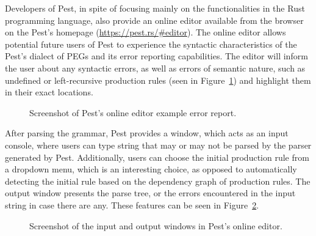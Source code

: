 \documentclass[english,bachelors,forcepolishlogotype]{wizthesis}
\begin{document}
Developers of Pest, in spite of focusing mainly on the functionalities in the
Rust programming language, also provide an online editor available from the
browser on the Pest's homepage (\url{https://pest.rs/#editor}). The online
editor allows potential future users of Pest to experience the syntactic
characteristics of the Pest's dialect of PEGs and its error reporting
capabilities. The editor will inform the user about any syntactic errors, as
well as errors of semantic nature, such as undefined or left-recursive
production rules (seen in Figure~\ref{fig:pest-error}) and highlight them in
their exact locations.

\begin{figure}[ht]
  \centering
  \caption{Screenshot of Pest's online editor example error report.}
  \label{fig:pest-error}
\end{figure}

After parsing the grammar, Pest provides a window, which acts as an input
console, where users can type string that may or may not be parsed by the parser
generated by Pest. Additionally, users can choose the initial production rule
from a dropdown menu, which is an interesting choice, as opposed to
automatically detecting the initial rule based on the dependency graph of
production rules. The output window presents the parse tree, or the errors
encountered in the input string in case there are any. These features can be
seen in Figure~\ref{fig:pest-output}.

\begin{figure}[ht]
  \centering
  \caption{Screenshot of the input and output windows in Pest's online editor.}
  \label{fig:pest-output}
\end{figure}
\end{document}
